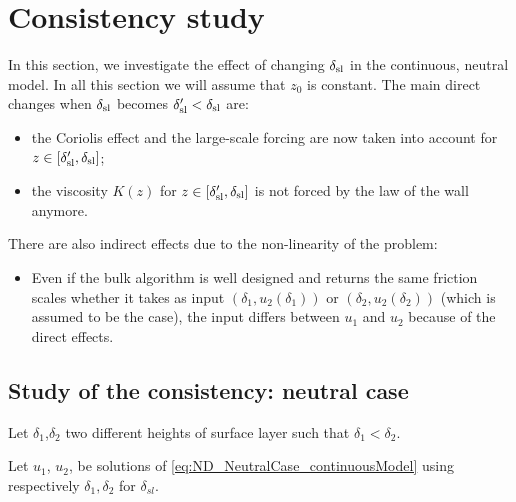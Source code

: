 \section{Consistency study}
In this section, we investigate the effect of changing
$\delta_{\rm sl}$ in the continuous, neutral model.
In all this section we will assume that
$z_0$ is constant.
The main direct changes when $\delta_{\rm sl}$ becomes
$\delta_{\rm sl}' < \delta_{\rm sl}$ are:
\begin{itemize}
\item the Coriolis effect and the large-scale forcing are
now taken into account for $z \in 
[\delta_{\rm sl}', \delta_{\rm sl}]$;
\item the viscosity $K(z)$ for $z \in 
[\delta_{\rm sl}', \delta_{\rm sl}]$ is not forced by the law
of the wall anymore.
\end{itemize}
There are also indirect effects due to the non-linearity of the
problem:
\begin{itemize}
	\item Even if the bulk algorithm is well designed and returns
		the same friction scales whether it takes as input
		$(\delta_1, u_2(\delta_1))$ or 
		$(\delta_2, u_2(\delta_2))$ (which is assumed to
		be the case),
		the input differs between $u_1$ and $u_2$ because
		of the direct effects.
\end{itemize}

\subsection{Study of the consistency: neutral case}
Let $\delta_1$,$\delta_2$ two
different heights of surface layer
such that $\delta_1 < \delta_2$.

Let $u_1$, $u_2$, be solutions of 
\eqref{eq:ND_NeutralCase_continuousModel} using
respectively $\delta_1, \delta_2$ for $\delta_{sl}$.

